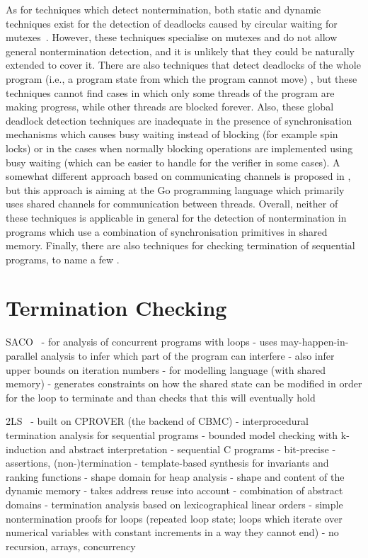 As for techniques which detect nontermination, both static and dynamic
techniques exist for the detection of deadlocks caused by circular waiting for
mutexes~\cite{CC14,agarwal2010detection,bensalem2005scalable}.
However, these techniques specialise on mutexes and do not allow general nontermination detection, and it is unlikely that they could be naturally extended to cover it.
There are also techniques that detect deadlocks of the whole program (i.e., a program state from which the program cannot move) \cite{Chaki2005,Demartini99}, but these techniques cannot find cases in which only some threads of the program are making progress, while other threads are blocked forever.
Also, these global deadlock detection techniques are inadequate in the presence of synchronisation mechanisms which causes busy waiting instead of blocking (for example spin locks) or in the cases when normally blocking operations are implemented using busy waiting (which can be easier to handle for the verifier in some cases).
A somewhat different approach based on communicating channels is proposed in \cite{Ng2016}, but this approach is aiming at the Go programming language which primarily uses shared channels for communication between threads.
Overall, neither of these techniques is applicable in general for the detection of nontermination in programs which use a combination of synchronisation primitives in shared memory.
Finally, there are also techniques for checking termination of sequential programs, to name a few \cite{Giesl2017,Chen2018}.

\section{Termination Checking}

SACO~\cite{Albert2017}
- for analysis of concurrent programs with loops
- uses may-happen-in-parallel analysis to infer which part of the program can interfere
- also infer upper bounds on iteration numbers
- for modelling language (with shared memory)
- generates constraints on how the shared state can be modified in order for the loop to terminate and than checks that this will eventually hold

2LS~\cite{Malik2020,Malik2018,Chen2017}
- built on CPROVER (the backend of CBMC)
- interprocedural termination analysis for sequential programs
- bounded model checking with k-induction and abstract interpretation
- sequential C programs
- bit-precise
- assertions, (non-)termination
- template-based synthesis for invariants and ranking functions
- shape domain for heap analysis
  - shape and content of the dynamic memory
  - takes address reuse into account
  - combination of abstract domains
- termination analysis based on lexicographical linear orders
- simple nontermination proofs for loops (repeated loop state; loops which iterate over numerical variables with constant increments in a way they cannot end)
- no recursion, arrays, concurrency


